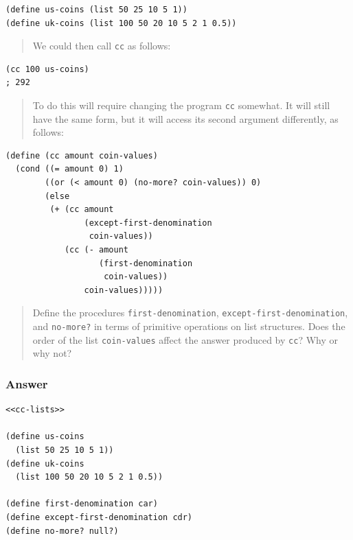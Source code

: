 \documentclass[final,fleqn,titlepage,twoside]{article}
\begin{document}
\begin{verbatim}
(define us-coins (list 50 25 10 5 1))
(define uk-coins (list 100 50 20 10 5 2 1 0.5))
\end{verbatim}

\begin{quote}
We could then call \texttt{cc} as follows:
\end{quote}

\begin{verbatim}
(cc 100 us-coins)
; 292
\end{verbatim}

\begin{quote}
To do this will require changing the program \texttt{cc} somewhat. It will
still have the same form, but it will access its second argument differently, as
follows:
\end{quote}

\begin{verbatim}
(define (cc amount coin-values)
  (cond ((= amount 0) 1)
        ((or (< amount 0) (no-more? coin-values)) 0)
        (else
         (+ (cc amount
                (except-first-denomination
                 coin-values))
            (cc (- amount
                   (first-denomination
                    coin-values))
                coin-values)))))
\end{verbatim}

\begin{quote}
Define the procedures \texttt{first-denomination},
\texttt{except-first-denomination}, and \texttt{no-more?} in terms of
primitive operations on list structures. Does the order of the list
\texttt{coin-values} affect the answer produced by \texttt{cc}? Why or why
not?
\end{quote}

\subsubsection{Answer}
\label{sec:org3a00a8e}
\begin{verbatim}
<<cc-lists>>

(define us-coins 
  (list 50 25 10 5 1))
(define uk-coins 
  (list 100 50 20 10 5 2 1 0.5))

(define first-denomination car)
(define except-first-denomination cdr)
(define no-more? null?)
\end{verbatim}
\end{document}
